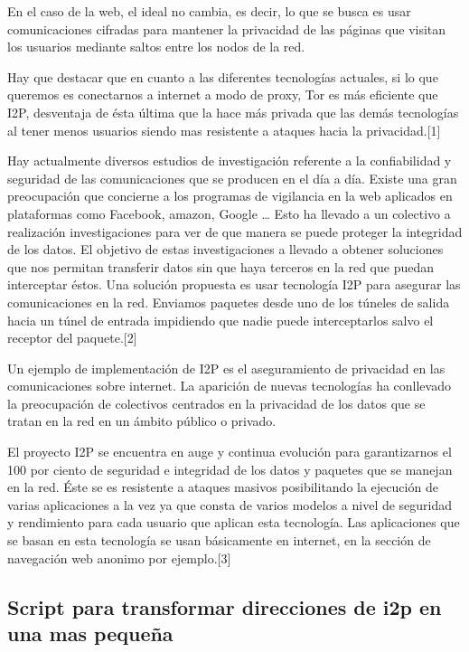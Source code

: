 \documentclass{article}
\begin{document}
En el caso de la web, el ideal no cambia, es decir, lo que se busca es usar comunicaciones cifradas para mantener la privacidad de las páginas que visitan los usuarios mediante saltos entre los nodos de la red.

Hay que destacar que en cuanto a las diferentes tecnologías actuales, si lo que queremos es conectarnos a internet a modo de proxy,  Tor es más eficiente que I2P, desventaja de ésta última que la hace más privada que las demás tecnologías al tener menos usuarios siendo mas resistente a ataques hacia la privacidad.[1]

Hay actualmente diversos estudios de investigación referente a la confiabilidad y seguridad de las comunicaciones que se producen en el día a día.
Existe una gran preocupación que concierne a los programas de vigilancia en la web aplicados en plataformas como Facebook, amazon, Google … Esto ha llevado a un colectivo a realización investigaciones para ver de que manera se puede proteger la integridad de los datos. El objetivo de estas investigaciones a llevado a obtener soluciones que nos permitan transferir datos sin que haya terceros
en la red que puedan interceptar éstos.
Una solución propuesta es usar tecnología I2P para asegurar las comunicaciones en la red. Enviamos paquetes desde uno de los túneles de salida hacia un túnel de entrada  impidiendo que nadie puede interceptarlos salvo el receptor del paquete.[2]

Un ejemplo de implementación de I2P es el aseguramiento de privacidad en las comunicaciones sobre internet.
La aparición de nuevas tecnologías ha conllevado la preocupación de colectivos centrados en la privacidad de los datos que se tratan en la red en un ámbito público o privado.

El proyecto I2P se encuentra en auge y continua evolución para garantizarnos el 100 por ciento de seguridad e integridad de los datos y paquetes que se manejan en la red. Éste se  es resistente a ataques masivos posibilitando la ejecución de varias aplicaciones a 
la vez ya que consta de varios modelos a nivel de seguridad y rendimiento para cada usuario que aplican esta tecnología. Las aplicaciones que se basan en esta tecnología se usan básicamente en internet, en la sección de navegación web anonimo por ejemplo.[3]

\subsection{Script para transformar direcciones de i2p en una mas pequeña}
\end{document}
